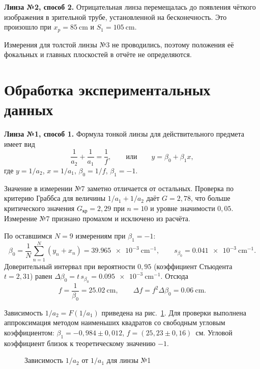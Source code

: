 \documentclass[14pt,a4paper]{extarticle}
\begin{document}
\textbf{Линза №2, способ 2.} Отрицательная линза перемещалась до появления чёткого изображения в зрительной трубе, установленной на бесконечность. Это произошло при $x_p = \SI{85}{\cm}$ и $S_1 = \SI{105}{\cm}$.

Измерения для толстой линзы №3 не проводились, поэтому положения её фокальных и главных плоскостей в отчёте не определяются.

\section*{Обработка экспериментальных данных}

\textbf{Линза №1, способ 1.} Формула тонкой линзы для действительного предмета имеет вид
\[
\frac{1}{a_2} + \frac{1}{a_1} = \frac{1}{f},
\qquad\text{или}\qquad
y = \beta_0 + \beta_1 x,
\]
где $y = 1/a_2$, $x = 1/a_1$, $\beta_0 = 1/f$, $\beta_1 = -1$.

Значение в измерении №7 заметно отличается от остальных. Проверка по критерию Граббса для величины $1/a_1 + 1/a_2$ даёт $G = 2{,}78$, что больше критического значения $G_{\text{кр}} = 2{,}29$ при $n = 10$ и уровне значимости $0{,}05$. Измерение №7 признано промахом и исключено из расчёта.

По оставшимся $N = 9$ измерениям при $\beta_1 = -1$:
\[
\beta_0 = \frac{1}{N}\sum_{n=1}^{N}\left(y_n + x_n\right) = \SI{39,965e-3}{\cm^{-1}},
\qquad
s_{\beta_0} = \SI{0,041e-3}{\cm^{-1}}.
\]
Доверительный интервал при вероятности $0{,}95$ (коэффициент Стьюдента $t = 2{,}31$) равен $\Delta\beta_0 = t\,s_{\beta_0} = \SI{0,095e-3}{\cm^{-1}}$. Отсюда
\[
f = \frac{1}{\beta_0} = \SI{25,02}{\cm},
\qquad
\Delta f = f^2 \Delta\beta_0 = \SI{0,06}{\cm}.
\]

Зависимость $1/a_2 = F(1/a_1)$ приведена на рис.~\ref{fig:lens1}. Для проверки выполнена аппроксимация методом наименьших квадратов со свободным угловым коэффициентом: $\beta_1 = -0{,}984 \pm 0{,}012$, $f = (25{,}23 \pm 0{,}16)$~см. Угловой коэффициент близок к теоретическому значению $-1$.

\begin{figure}[htbp]
\centering
{}
\caption{Зависимость $1/a_2$ от $1/a_1$ для линзы №1}
\label{fig:lens1}
\end{figure}
\end{document}
